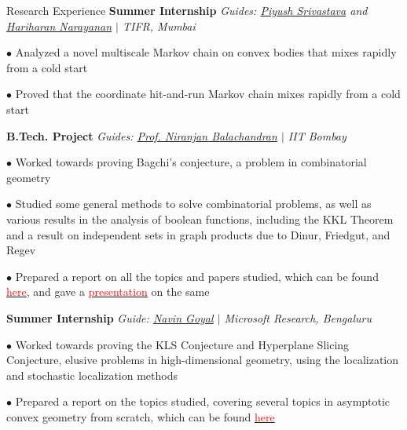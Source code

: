 
\begin{rubric}{Research Experience}
    \entry*[2022] \textbf{Summer Internship} \hfill \emph{Guides: \href{https://www.tifr.res.in/~piyush.srivastava/}{Piyush Srivastava} and \href{https://www.tifr.res.in/~hariharan.narayanan/}{Hariharan Narayanan} $\mid$ TIFR, Mumbai}

        $\bullet$ Analyzed a novel multiscale Markov chain on convex bodies that mixes rapidly from a cold start

        $\bullet$ Proved that the coordinate hit-and-run Markov chain mixes rapidly from a cold start


    \entry*[\phantom{.}2022] \textbf{B.Tech. Project} \hfill \emph{Guides: \href{https://homepages.iitb.ac.in/~niranj/}{Prof. Niranjan Balachandran} $\mid$ IIT Bombay}

        $\bullet$ Worked towards proving Bagchi's conjecture, a problem in combinatorial geometry

        $\bullet$ Studied some general methods to solve combinatorial problems, as well as various results in the analysis of boolean functions, including the KKL Theorem and a result on independent sets in graph products due to Dinur, Friedgut, and Regev

        $\bullet$ Prepared a report on all the topics and papers studied, which can be found \href{https://amitrajaraman.github.io/research/pls/btp1-report.pdf}{\textcolor{red}{here}}, and gave a \href{https://amitrajaraman.github.io/research/pls/btp-presentation.pdf}{\textcolor{red}{presentation}} on the same
    
    \entry*[2021] \textbf{Summer Internship} \hfill \emph{Guide: \href{https://www.microsoft.com/en-us/research/people/navingo/}{Navin Goyal} $\mid$ Microsoft Research, Bengaluru}
        
        $\bullet$ Worked towards proving the KLS Conjecture and Hyperplane Slicing Conjecture, elusive problems in high-dimensional geometry, using the localization and stochastic localization methods

        $\bullet$ Prepared a report on the topics studied, covering several topics in asymptotic convex geometry from scratch, which can be found \href{https://amitrajaraman.github.io/notes/convex-geometry/main.pdf}{\textcolor{red}{here}}

\end{rubric}